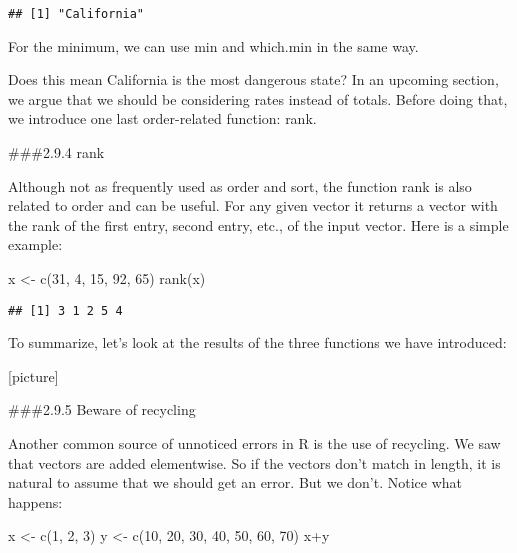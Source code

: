 \documentclass[
]{article}
\newenvironment{Shaded}{\begin{snugshade}}{\end{snugshade}}
\newcommand{\DecValTok}[1]{\textcolor[rgb]{0.00,0.00,0.81}{#1}}
\newcommand{\FunctionTok}[1]{\textcolor[rgb]{0.00,0.00,0.00}{#1}}
\newcommand{\NormalTok}[1]{#1}
\newcommand{\OtherTok}[1]{\textcolor[rgb]{0.56,0.35,0.01}{#1}}
\newcommand{\SpecialCharTok}[1]{\textcolor[rgb]{0.00,0.00,0.00}{#1}}
\begin{document}
\begin{verbatim}
## [1] "California"
\end{verbatim}

For the minimum, we can use min and which.min in the same way.

Does this mean California is the most dangerous state? In an upcoming
section, we argue that we should be considering rates instead of totals.
Before doing that, we introduce one last order-related function: rank.

\#\#\#2.9.4 rank

Although not as frequently used as order and sort, the function rank is
also related to order and can be useful. For any given vector it returns
a vector with the rank of the first entry, second entry, etc., of the
input vector. Here is a simple example:

\begin{Shaded}
\begin{Highlighting}[]
\NormalTok{x }\OtherTok{\textless{}{-}} \FunctionTok{c}\NormalTok{(}\DecValTok{31}\NormalTok{, }\DecValTok{4}\NormalTok{, }\DecValTok{15}\NormalTok{, }\DecValTok{92}\NormalTok{, }\DecValTok{65}\NormalTok{)}
\FunctionTok{rank}\NormalTok{(x)}
\end{Highlighting}
\end{Shaded}

\begin{verbatim}
## [1] 3 1 2 5 4
\end{verbatim}

To summarize, let's look at the results of the three functions we have
introduced:

{[}picture{]}

\#\#\#2.9.5 Beware of recycling

Another common source of unnoticed errors in R is the use of recycling.
We saw that vectors are added elementwise. So if the vectors don't match
in length, it is natural to assume that we should get an error. But we
don't. Notice what happens:

\begin{Shaded}
\begin{Highlighting}[]
\NormalTok{x }\OtherTok{\textless{}{-}} \FunctionTok{c}\NormalTok{(}\DecValTok{1}\NormalTok{, }\DecValTok{2}\NormalTok{, }\DecValTok{3}\NormalTok{)}
\NormalTok{y }\OtherTok{\textless{}{-}} \FunctionTok{c}\NormalTok{(}\DecValTok{10}\NormalTok{, }\DecValTok{20}\NormalTok{, }\DecValTok{30}\NormalTok{, }\DecValTok{40}\NormalTok{, }\DecValTok{50}\NormalTok{, }\DecValTok{60}\NormalTok{, }\DecValTok{70}\NormalTok{)}
\NormalTok{x}\SpecialCharTok{+}\NormalTok{y}
\end{Highlighting}
\end{Shaded}
\end{document}
